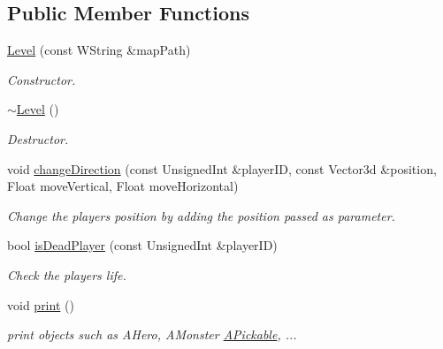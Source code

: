 \subsection*{Public Member Functions}
\begin{DoxyCompactItemize}
\item 
\mbox{\label{classLevel_a449da6ec6c9863a35c94d2fcb2755433}} 
\hyperlink{classLevel_a449da6ec6c9863a35c94d2fcb2755433}{Level} (const W\+String \&map\+Path)
\begin{DoxyCompactList}\small\item\em Constructor. \end{DoxyCompactList}\item 
\mbox{\label{classLevel_a249eac1e8f19ff44134efa5e986feaca}} 
\hyperlink{classLevel_a249eac1e8f19ff44134efa5e986feaca}{$\sim$\+Level} ()
\begin{DoxyCompactList}\small\item\em Destructor. \end{DoxyCompactList}\item 
void \hyperlink{classLevel_a7fbf2259277a0be256738886cd82796a}{change\+Direction} (const Unsigned\+Int \&player\+ID, const Vector3d \&position, Float move\+Vertical, Float move\+Horizontal)
\begin{DoxyCompactList}\small\item\em Change the player\textquotesingle{}s position by adding the position passed as parameter. \end{DoxyCompactList}\item 
bool \hyperlink{classLevel_a0ce4503fce6dd9f1a96036a50743d6c6}{is\+Dead\+Player} (const Unsigned\+Int \&player\+ID)
\begin{DoxyCompactList}\small\item\em Check the player\textquotesingle{}s life. \end{DoxyCompactList}\item 
\mbox{\label{classLevel_a5188de55912386ca786cdbe093ca2af4}} 
void \hyperlink{classLevel_a5188de55912386ca786cdbe093ca2af4}{print} ()
\begin{DoxyCompactList}\small\item\em print objects such as A\+Hero, A\+Monster \hyperlink{classAPickable}{A\+Pickable}, ... \end{DoxyCompactList}\end{DoxyCompactItemize}


